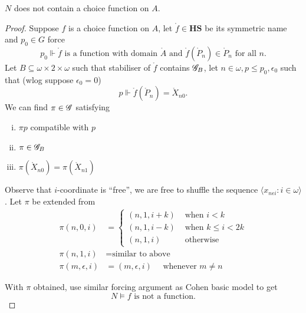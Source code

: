 \begin{theorem}
    \(N\) does not contain a choice function on \(A\).
\end{theorem}
\begin{proof}
Suppose \(f\) is a choice function on \(A\), let \(\mathring{f}\in\mathbf{HS}\) be its symmetric name and \(p_0\in G\) force
\[p_0\Vdash \mathring{f}\text{ is a function with domain } \mathring{A} \text{ and } \mathring{f}(\mathring{P}_n) \in \mathring{P}_n\text{ for all }n .\]
Let \(B\subseteq \omega\times2\times\omega\) such that stabiliser of \(\mathring{f}\) contains \(\mathscr{G}_B\),
let \(n\in\omega, p\leq p_0, \epsilon_0\) such that (wlog suppose \(\epsilon_0 = 0\))
\[ p\Vdash \mathring{f}(\mathring{P}_n) = \mathring{X}_{n0}. \]
We can find \(\pi\in\mathscr{G}\) satisfying
\begin{enumerate}[i.]
    \item \(\pi p\) compatible with \(p\)
    \item \(\pi \in \mathscr{G}_B\)
    \item \(\pi(\mathring{X}_{n0}) = \pi(\mathring{X}_{n1})\)
\end{enumerate}
Observe that \(i\)-coordinate is ``free'',
we are free to shuffle the sequence \(\langle x_{n\epsilon i}:i\in\omega\rangle\).
Let \(\pi\) be extended from
\begin{align*}
    \pi(n,0,i) &=
    \begin{cases}
        (n,1,i+k) &\text{ when } i < k \\
        (n,1,i-k) &\text{ when } k \leq i < 2k \\
        (n,1,i) &\text{ otherwise}
    \end{cases} \\
    \pi(n,1,i) &= \text{similar to above} \\
    \pi(m,\epsilon,i) &= (m,\epsilon,i) \quad\text{ whenever }m \ne n
\end{align*}

With \(\pi\) obtained, use similar forcing argument as Cohen basic model to get
\[ N\models f\text{ is not a function}. \tag*{\qedhere} \]
\end{proof}
